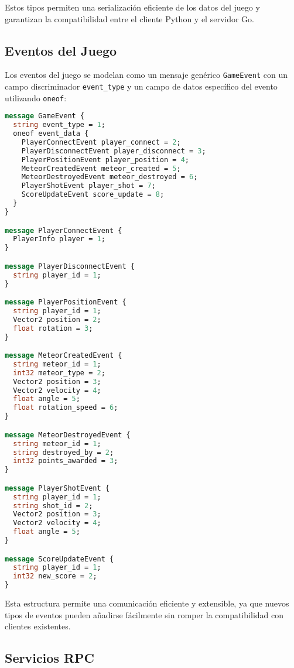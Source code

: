 \documentclass[12pt,letterpaper]{article}
\begin{document}
Estos tipos permiten una serialización eficiente de los datos del juego y garantizan la compatibilidad entre el cliente Python y el servidor Go.

\subsection{Eventos del Juego}

Los eventos del juego se modelan como un mensaje genérico \texttt{GameEvent} con un campo discriminador \texttt{event\_type} y un campo de datos específico del evento utilizando \texttt{oneof}:

\begin{lstlisting}[language=proto, caption=Definición de eventos del juego]
message GameEvent {
  string event_type = 1;
  oneof event_data {
    PlayerConnectEvent player_connect = 2;
    PlayerDisconnectEvent player_disconnect = 3;
    PlayerPositionEvent player_position = 4;
    MeteorCreatedEvent meteor_created = 5;
    MeteorDestroyedEvent meteor_destroyed = 6;
    PlayerShotEvent player_shot = 7;
    ScoreUpdateEvent score_update = 8;
  }
}

message PlayerConnectEvent {
  PlayerInfo player = 1;
}

message PlayerDisconnectEvent {
  string player_id = 1;
}

message PlayerPositionEvent {
  string player_id = 1;
  Vector2 position = 2;
  float rotation = 3;
}

message MeteorCreatedEvent {
  string meteor_id = 1;
  int32 meteor_type = 2;
  Vector2 position = 3;
  Vector2 velocity = 4;
  float angle = 5;
  float rotation_speed = 6;
}

message MeteorDestroyedEvent {
  string meteor_id = 1;
  string destroyed_by = 2;
  int32 points_awarded = 3;
}

message PlayerShotEvent {
  string player_id = 1;
  string shot_id = 2;
  Vector2 position = 3;
  Vector2 velocity = 4;
  float angle = 5;
}

message ScoreUpdateEvent {
  string player_id = 1;
  int32 new_score = 2;
}
\end{lstlisting}

Esta estructura permite una comunicación eficiente y extensible, ya que nuevos tipos de eventos pueden añadirse fácilmente sin romper la compatibilidad con clientes existentes.

\subsection{Servicios RPC}
\end{document}
